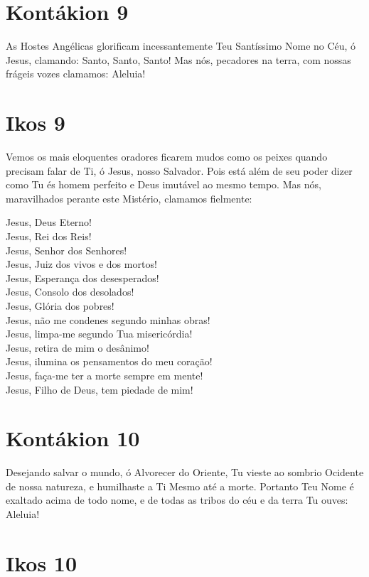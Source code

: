 \documentclass{subfiles}
\begin{document}
\section*{Kontákion 9}

As Hostes Angélicas glorificam incessantemente Teu Santíssimo Nome
no Céu, ó Jesus, clamando: Santo, Santo, Santo! Mas nós, pecadores na terra,
com nossas frágeis vozes clamamos: Aleluia!

\section*{Ikos 9}

Vemos os mais eloquentes oradores ficarem mudos como os peixes
quando precisam falar de Ti, ó Jesus, nosso Salvador. Pois está além de seu
poder dizer como Tu és homem perfeito e Deus imutável ao mesmo tempo.
Mas nós, maravilhados perante este Mistério, clamamos fielmente:

Jesus, Deus Eterno! \\
Jesus, Rei dos Reis! \\
Jesus, Senhor dos Senhores! \\
Jesus, Juiz dos vivos e dos mortos! \\
Jesus, Esperança dos desesperados! \\
Jesus, Consolo dos desolados! \\
Jesus, Glória dos pobres! \\
Jesus, não me condenes segundo minhas obras! \\
Jesus, limpa-me segundo Tua misericórdia! \\
Jesus, retira de mim o desânimo! \\
Jesus, ilumina os pensamentos do meu coração! \\
Jesus, faça-me ter a morte sempre em mente! \\
Jesus, Filho de Deus, tem piedade de mim!

\section*{Kontákion 10}

Desejando salvar o mundo, ó Alvorecer do Oriente, Tu vieste ao
sombrio Ocidente de nossa natureza, e humilhaste a Ti Mesmo até a morte.
Portanto Teu Nome é exaltado acima de todo nome, e de todas as tribos do
céu e da terra Tu ouves: Aleluia!

\section*{Ikos 10}
\end{document}
